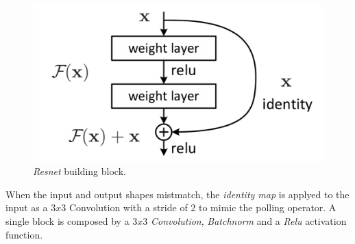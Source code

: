 \documentclass[../document.tex]{subfiles}
\begin{document}
\begin{figure}[H]
	\centering
	\includegraphics[scale=0.3]{img/implementation/estimator/resnet_block.png}
	\caption{\emph{Resnet} building block.}
\end{figure}
When the input and output shapes mistmatch, the \emph{identity map} is applyed to the input as a $3x3$ Convolution with a stride of 2 to mimic the polling operator. A single block is composed by a $3x3$ \emph{Convolution}, \emph{Batchnorm} and a \emph{Relu} activation function. 
\end{document}
